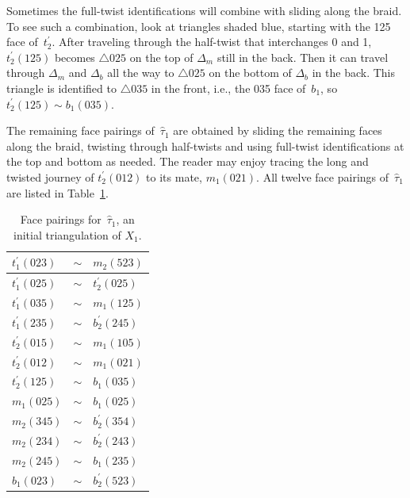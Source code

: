 \documentclass[reqno]{amsart}
\theoremstyle{plain}
\theoremstyle{definition}
\begin{document}
Sometimes the full-twist identifications will combine with sliding along the braid.  To see such a combination, look at triangles shaded blue, starting with the 125 face of~$t_2^\prime$.  After traveling through the half-twist that interchanges 0 and 1, $t_2^\prime(125)$ becomes $\triangle 025$ on the top of $\Delta_m$ still in the back.  Then it can travel through $\Delta_m$ and $\Delta_b$ all the way to $\triangle 025$ on the bottom of $\Delta_b$ in the back.  This triangle is identified to $\triangle 035$ in the front, i.e., the 035 face of~$b_1$, so $t_2^\prime(125)\sim b_1(035)$.

The remaining face pairings of~$\hat{\tau}_1$ are obtained by sliding the remaining faces along the braid, twisting through half-twists and using full-twist identifications at the top and bottom as needed.  The reader may enjoy tracing the long and twisted journey of $t_2^\prime(012)$ to its mate, $m_1(021)$.  All twelve face pairings of~$\hat{\tau}_1$ are listed in Table~\ref{table:p=1prelim}.  

\begin{table}[ht]
\caption{Face pairings for~$\hat{\tau}_1$, an initial triangulation of $X_{1}$.\label{table:p=1prelim}\\}
\begin{tabular}{ |l c l|  }
 \hline
 $t_1^\prime(023)$    &$\sim$	&$m_2(523)$\\
  \hline
 $t_1^\prime(025)$    &$\sim$	&$t_2^\prime(025)$\\
  \hline
 $t_1^\prime(035)$    &$\sim$	&$m_1(125)$\\
  \hline
 $t_1^\prime(235)$    &$\sim$	&$b_2^\prime(245)$\\
  \hline
 $t_2^\prime(015)$    &$\sim$	&$m_1(105)$\\
  \hline
 $t_2^\prime(012)$    &$\sim$	&$m_1(021)$\\
  \hline
 $t_2^\prime(125)$    &$\sim$	&$b_1(035)$\\
  \hline
 $m_1(025)$    &$\sim$	&$b_1(025)$\\
  \hline
 $m_2(345)$    &$\sim$	&$b_2^\prime(354)$\\
  \hline
 $m_2(234)$    &$\sim$	&$b_2^\prime(243)$\\
  \hline
 $m_2(245)$    &$\sim$	&$b_1(235)$\\
  \hline
 $b_1(023)$    &$\sim$	&$b_2^\prime(523)$\\
 \hline
\end{tabular}
\end{table}
\end{document}
